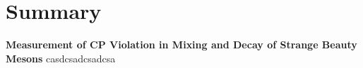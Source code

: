\chapter*{Summary}
\chaptermark{}

{\Large\bf
  Measurement of CP Violation in Mixing and Decay of Strange Beauty Mesons
}
\vspace*{0.05\textwidth}
casdcsadcsadcsa
